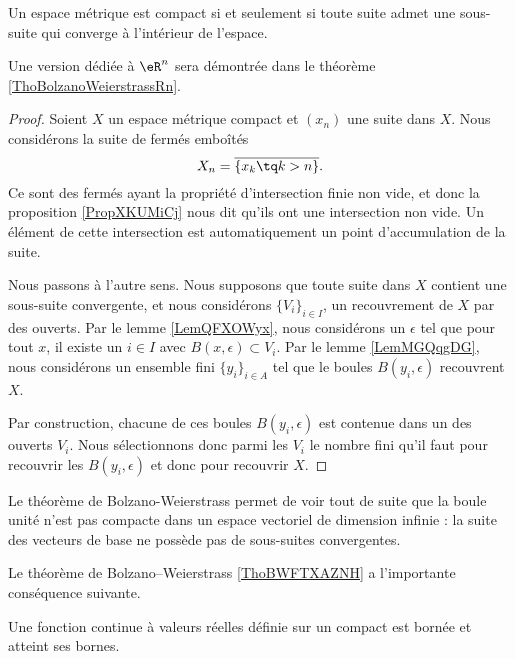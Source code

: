 \begin{theorem}\label{ThoBWFTXAZNH}
    Un espace métrique est compact si et seulement si toute suite admet une sous-suite qui converge à l'intérieur de l'espace.
\end{theorem}
Une version dédiée à \( \eR^n\) sera démontrée dans le théorème \ref{ThoBolzanoWeierstrassRn}.

\begin{proof}
   Soient \( X\) un espace métrique compact et \( (x_n)\) une suite dans \( X\). Nous considérons la suite de fermés emboîtés
   \begin{equation}
       X_n=\overline{ \{ x_k\tq k>n \} }.
   \end{equation}
   Ce sont des fermés ayant la propriété d'intersection finie non vide, et donc la proposition \ref{PropXKUMiCj} nous dit qu'ils ont une intersection non vide. Un élément de cette intersection est automatiquement un point d'accumulation de la suite.

   Nous passons à l'autre sens. Nous supposons que toute suite dans \( X\) contient une sous-suite convergente, et nous considérons \( \{ V_i \}_{i\in I}\), un recouvrement de \( X\) par des ouverts. Par le lemme \ref{LemQFXOWyx}, nous considérons un \( \epsilon\) tel que pour tout \( x\), il existe un \( i\in I\) avec \( B(x,\epsilon)\subset V_i\). Par le lemme \ref{LemMGQqgDG}, nous considérons un ensemble fini \( \{ y_i \}_{i\in A}\) tel que le boules \( B(y_i,\epsilon)\) recouvrent \( X\).

   Par construction, chacune de ces boules \( B(y_i,\epsilon)\) est contenue dans un des ouverts \( V_i\). Nous sélectionnons donc parmi les \( V_i\) le nombre fini qu'il faut pour recouvrir les \( B(y_i,\epsilon)\) et donc pour recouvrir \( X\).
\end{proof}

\begin{example}\label{ExEFYooTILPDk}
    Le théorème de Bolzano-Weierstrass permet de voir tout de suite que la boule unité n'est pas compacte dans un espace vectoriel de dimension infinie : la suite des vecteurs de base ne possède pas de sous-suites convergentes.
\end{example}

Le théorème de Bolzano–Weierstrass \ref{ThoBWFTXAZNH} a l'importante conséquence suivante.
\begin{theorem}[Weierstrass]		\label{ThoWeirstrassRn}
	Une fonction continue à valeurs réelles définie sur un compact est bornée et atteint ses bornes.
\end{theorem}

